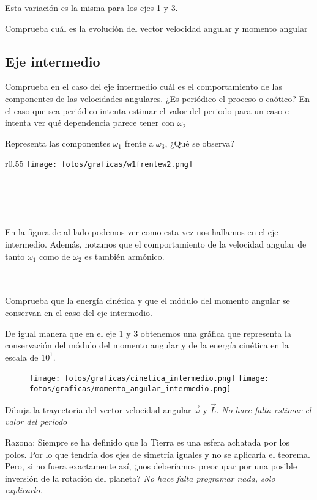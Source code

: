 \documentclass[11pt]{article}
\newcommand{\laputa}[1]{\begin{note}{#1}{}\end{note}}
\begin{document}
				\noindent Esta variación es la misma para los ejes 1 y 3.
			\clearpage
			\laputa{Comprueba cuál es la evolución del vector velocidad angular y momento angular} %
				
        \subsection{Eje intermedio}
            \laputa{Comprueba en el caso del eje intermedio cuál es el comportamiento de las componentes de las velocidades angulares. ¿Es periódico el proceso o caótico? En el caso que sea periódico intenta estimar el valor del periodo para un caso e intenta ver qué dependencia parece tener con $\omega_2$}
            \laputa{Representa las componentes $\omega_1$ frente a $\omega_3$, ¿Qué se observa?}
				\begin{wrapfigure}[8]{r}{0.55\textwidth}
					\vspace{-0.65cm}
					\centering
					\texttt{[image: fotos/graficas/w1frentew2.png]}
				\end{wrapfigure}

				\hspace{0cm}\\\hspace{0cm}\\\hspace{0cm}\\\hspace{0cm}\\\noindent En la figura de al lado podemos ver como esta vez nos hallamos en el eje intermedio. Además, notamos que el comportamiento de la velocidad angular de tanto $\omega_1$ como de $\omega_2$ es también armónico.\\
			
			\hspace{0cm}\\\hspace{0cm}\\
            \laputa{Comprueba que la energía cinética y que el módulo del momento angular se conservan en el caso del eje intermedio.}
				\noindent De igual manera que en el eje 1 y 3 obtenemos una gráfica que representa la conservación del módulo del momento angular y de la energía cinética en la escala de $10^1$.
				\begin{figure}[h]
					\vspace{-0.3cm}
					\centering
					\texttt{[image: fotos/graficas/cinetica\_intermedio.png]}
					\texttt{[image: fotos/graficas/momento\_angular\_intermedio.png]}
				\end{figure}
            \laputa{Dibuja la trayectoria del vector velocidad angular $\vec{\omega}$ y $\vec{L}$. \textit{No hace falta estimar el valor del periodo}}
            \laputa{Razona: Siempre se ha definido que la Tierra es una esfera achatada por los polos. Por lo que tendría dos ejes de simetría iguales y no se aplicaría el teorema. Pero, si no fuera exactamente así, ¿nos deberíamos preocupar por una posible inversión de la rotación del planeta? \textit{No hace falta programar nada, solo explicarlo.}}
            
\end{document}
